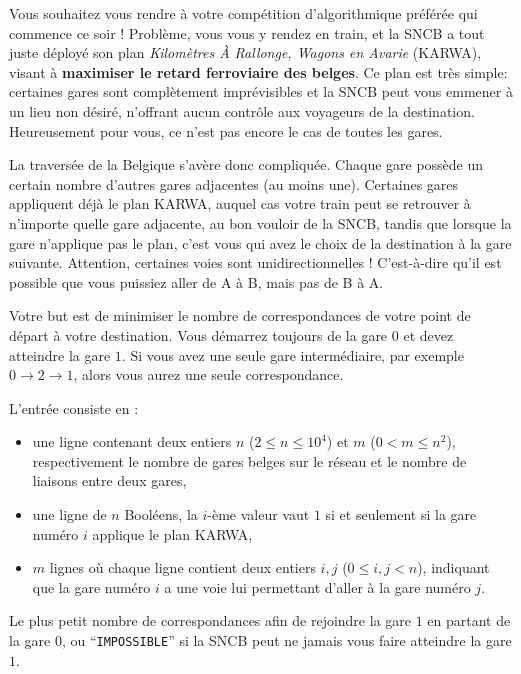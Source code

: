 \problemname{\problemyamlname}


Vous souhaitez vous rendre à votre compétition d'algorithmique préférée qui commence ce soir ! Problème, vous vous y rendez en train, et la SNCB a tout juste déployé son plan \emph{Kilomètres À Rallonge, Wagons en Avarie} (KARWA), visant à \textbf{maximiser le retard ferroviaire des belges}. Ce plan est très simple: certaines gares sont complètement imprévisibles et la SNCB peut vous emmener à un lieu non désiré, n'offrant aucun contrôle aux voyageurs de la destination. Heureusement pour vous, ce n'est pas encore le cas de toutes les gares.

La traversée de la Belgique s'avère donc compliquée. Chaque gare possède un certain nombre d'autres gares adjacentes (au moins une). Certaines gares appliquent déjà le plan KARWA, auquel cas votre train peut se retrouver à n'importe quelle gare adjacente, au bon vouloir de la SNCB, tandis que lorsque la gare n'applique pas le plan, c'est vous qui avez le choix de la destination à la gare suivante. Attention, certaines voies sont unidirectionnelles ! C'est-à-dire qu'il est possible que vous puissiez aller de A à B, mais pas de B à A.

Votre but est de minimiser le nombre de correspondances de votre point de départ à votre destination. Vous démarrez toujours de la gare $0$ et devez atteindre la gare $1$. Si vous avez une seule gare intermédiaire, par exemple $0 \rightarrow 2 \rightarrow 1$, alors vous aurez une seule correspondance.

\begin{Input}
	L'entrée consiste en :
	\begin{itemize}
		\item une ligne contenant deux entiers $n$ ($2 \le n \le 10^4$) et $m$ ($0 < m \le n^2$), respectivement le nombre de gares belges sur le réseau et le nombre de liaisons entre deux gares,
		\item une ligne de $n$ Booléens, la $i$-ème valeur vaut $1$ si et seulement si la gare numéro $i$ applique le plan KARWA,
		\item $m$ lignes où chaque ligne contient deux entiers $i, j$ ($0 \leq i,j < n$), indiquant que la gare numéro $i$ a une voie lui permettant d'aller à la gare numéro $j$.
	\end{itemize}
\end{Input}

\begin{Output}
	Le plus petit nombre de correspondances afin de rejoindre la gare $1$ en partant de la gare $0$, ou ``\texttt{IMPOSSIBLE}'' si la SNCB peut ne jamais vous faire atteindre la gare $1$.
\end{Output}

